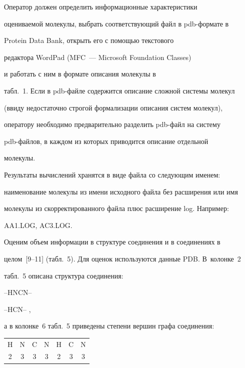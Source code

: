    


   Оператор должен определить информационные характеристики 


оцениваемой молекулы, выбрать соответствующий файл в pdb-фор\-ма\-те в 


Protein Data Bank, открыть его с помощью текстового 


редактора WordPad (MFC~--- Microsoft Foundation Classes) 


и работать с ним в формате описания молекулы в 


табл.~1. Если в pdb-фай\-ле содержится описание сложной сис\-те\-мы молекул 


(ввиду недостаточно строгой формализации описания систем молекул), 


оператору необходимо предварительно разделить pdb-файл на сис\-те\-му 


   pdb-фай\-лов, в каждом из которых приводится описание отдельной 


молекулы.


   


   Результаты вычислений хранятся в виде файла со следующим именем: 


наименование молекулы из имени исходного файла без расширения или имя 


молекулы из скорректированного файла плюс расширение log. Например: 


AA1.LOG, AC3.LOG.


   


   Оценим объем информации в структуре соединения и в соединениях в 


целом~[9--11] (табл.~5). Для оценок используются данные PDB. В~колонке~2 


табл.~5 описана структура соединения: 


   \begin{center}


--HNCN-- 





--HCN-- ,


\end{center}


а в колонке~6 табл.~5 приведены степени вершин графа соединения: 


\begin{center}


\begin{tabular}{ccccccc}


H & N& C& N& H& C& N\\


2 & 3 & 3 & 3&  2&  3& 3


\end{tabular}


\end{center}





